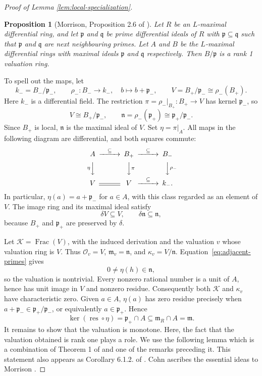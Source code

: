 \documentclass[12pt]{amsart}
\newtheorem{proposition}[theorem]{Proposition}
\theoremstyle{definition}
\numberwithin{subcase}{cases}
\theoremstyle{remark}
\DeclareMathOperator{\res}{res}
\DeclareMathOperator{\Frac}{Frac}
\begin{document}
\begin{proof}[Proof of Lemma \ref{lem:local-specialization}]
\begin{proposition}[Morrison, Proposition 2.6 of \cite{Morrison79}]
    Let $R$ be an $L$-maximal differential ring, and let $\mathfrak{p}$ and $\mathfrak{q}$ be prime differential ideals of $R$ with $\mathfrak{p} \subseteq \mathfrak{q}$ such that $\mathfrak{p}$ and $\mathfrak{q}$ are next neighbouring primes. Let $A$ and $B$ be the $L$-maximal differential rings with maximal ideals $\mathfrak{p}$ and $\mathfrak{q}$ respectively. Then $B/\mathfrak{p}$ is a rank 1 valuation ring.
\end{proposition}

To spell out the maps, let
\[
 k_-=B_-/\mathfrak p_-,\qquad
 \rho_-:B_-\longrightarrow k_-,\quad b\longmapsto b+\mathfrak p_-,
 \qquad V=B_+ / \mathfrak{p}_- \cong \rho_-(B_+).
\]
Here $k_-$ is a differential field. The restriction
$\pi=\rho_-|_{B_+}:B_+\to V$ has kernel $\mathfrak p_-$, so
\[
 V\cong B_+/\mathfrak p_-,\qquad
 \mathfrak n=\rho_-(\mathfrak p_+)\cong
              \mathfrak p_+/\mathfrak p_-.
\]
Since $B_+$ is local, $\mathfrak n$ is the maximal ideal of $V$.
Set $\eta=\pi|_A$. All maps in the following diagram are differential,
and both squares commute:
\[
\begin{CD}
 A @>{\subseteq}>> B_+ @>{\subseteq}>> B_-\\
 @V{\eta}VV @VV{\pi}V @VV{\rho_-}V\\
 V @= V @>{\subseteq}>> k_- .
\end{CD}
\]
In particular, $\eta(a)=a+\mathfrak p_-$ for $a\in A$, with this
class regarded as an element of $V$. The image ring and its maximal
ideal satisfy
\[
 \delta V\subseteq V,\qquad
 \delta\mathfrak n\subseteq\mathfrak n,
\]
because $B_+$ and $\mathfrak p_+$ are preserved by $\delta$.

Let $\mathcal K=\Frac(V)$, with the induced derivation and the
valuation $v$ whose valuation ring is $V$. Thus
$\mathcal O_v=V$, $\mathfrak m_v=\mathfrak n$, and
$\kappa_v=V/\mathfrak n$. Equation~\eqref{eq:adjacent-primes} gives
\[
 0\ne\eta(h)\in\mathfrak n,
\]
so the valuation is nontrivial.
Every nonzero rational number is a unit of $A$, hence has unit
image in $V$ and nonzero residue. Consequently both $\mathcal K$
and $\kappa_v$ have characteristic zero. Given $a \in A$, $\eta(a)$ has zero residue precisely when
$a+\mathfrak p_-\in\mathfrak p_+/\mathfrak p_-$, or equivalently
$a\in\mathfrak p_+$. Hence
\[
 \ker(\res\circ\eta)=\mathfrak p_+\cap A
 \subseteq\mathfrak m_R\cap A=\mathfrak m.
\]
It remains to show that the valuation is monotone. Here, the fact that the valuation obtained is rank one plays a role. We use the following lemma which is a combination of Theorem 1 of \cite{Cohn77} and one of the remarks preceding it. This statement also appears as Corollary 6.1.2. of \cite{AschenbrennervandenDriesvanderHoeven17}. Cohn ascribes the essential ideas to Morrison \cite{Morrison78}.


\end{proof}
\end{document}
